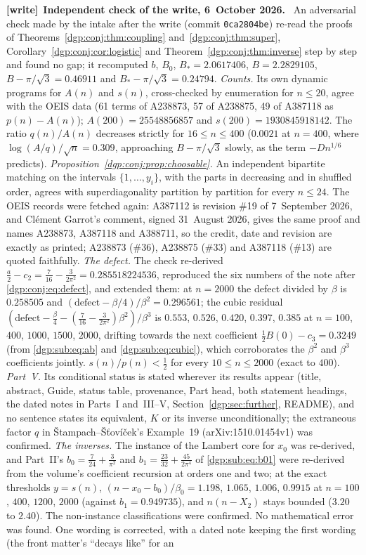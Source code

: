 \documentclass[11pt,letterpaper]{article}
\numberwithin{equation}{section}
\theoremstyle{remark}\newtheorem{remark}[theorem]{Remark}
\newcommand{\file}[1]{\nolinkurl{#1}}
\newenvironment{writenote}[1][]{\par\smallskip\begingroup\small
 \noindent\textbf{[write]}\if\relax\detokenize{#1}\relax\else~\textbf{#1.}\fi\ }%
 {\par\endgroup\smallskip}
\begin{document}
\begin{writenote}[Independent check of the write, 6~October 2026]
An adversarial check made by the intake after the write (commit \file{0ca2804be}) re-read the proofs of Theorems~\ref{dgp:conj:thm:coupling} and~\ref{dgp:conj:thm:super}, Corollary~\ref{dgp:conj:cor:logistic} and Theorem~\ref{dgp:conj:thm:inverse} step by step and found no gap; it recomputed $b$, $B_0$, $B_*=2.0617406$, $B=2.2829105$, $B-\pi/\sqrt3=0.46911$ and $B_*-\pi/\sqrt3=0.24794$. \emph{Counts.} Its own dynamic programs for $A(n)$ and $s(n)$, cross-checked by enumeration for $n\le20$, agree with the OEIS data (61 terms of A238873, 57 of A238875, 49 of A387118 as $p(n)-A(n)$); $A(200)=25548856857$ and $s(200)=1930845918142$. The ratio $q(n)/A(n)$ decreases strictly for $16\le n\le400$ ($0.0021$ at $n=400$, where $\log(A/q)/\sqrt n=0.309$, approaching $B-\pi/\sqrt3$ slowly, as the term $-Dn^{1/6}$ predicts). \emph{Proposition~\ref{dgp:conj:prop:choosable}.} An independent bipartite matching on the intervals $\{1,\dots,y_i\}$, with the parts in decreasing and in shuffled order, agrees with superdiagonality partition by partition for every $n\le24$. The OEIS records were fetched again: A387112 is revision \#19 of 7~September 2026, and Clément Garrot's comment, signed 31~August 2026, gives the same proof and names A238873, A387118 and A388711, so the credit, date and revision are exactly as printed; A238873 (\#36), A238875 (\#33) and A387118 (\#13) are quoted faithfully. \emph{The defect.} The check re-derived $\frac a2-c_2=\frac7{16}-\frac3{2\pi^2}=0.285518224536$, reproduced the six numbers of the note after \eqref{dgp:conj:eq:defect}, and extended them: at $n=2000$ the defect divided by $\beta$ is $0.258505$ and $(\text{defect}-\beta/4)/\beta^2=0.296561$; the cubic residual $(\text{defect}-\frac\beta4-(\frac7{16}-\frac3{2\pi^2})\beta^2)/\beta^3$ is $0.553$, $0.526$, $0.420$, $0.397$, $0.385$ at $n=100$, $400$, $1000$, $1500$, $2000$, drifting towards the next coefficient $\frac12B(0)-c_3=0.3249$ (from \eqref{dgp:sub:eq:ab} and \eqref{dgp:sub:eq:cubic}), which corroborates the $\beta^2$ and $\beta^3$ coefficients jointly. $s(n)/p(n)<\frac12$ for every $10\le n\le2000$ (exact to $400$). \emph{Part~V.} Its conditional status is stated wherever its results appear (title, abstract, Guide, status table, provenance, Part head, both statement headings, the dated notes in Parts~I and~III--V, Section~\ref{dgp:sec:further}, README), and no sentence states its equivalent, $K$ or its inverse unconditionally; the extraneous factor $q$ in Štampach--Šťovíček's Example~19 (arXiv:1510.01454v1) was confirmed. \emph{The inverses.} The instance of the Lambert core for $x_0$ was re-derived, and Part~II's $b_0=\frac7{24}+\frac3{\pi^2}$ and $b_1=\frac{23}{32}+\frac{45}{2\pi^4}$ of \eqref{dgp:sub:eq:b01} were re-derived from the volume's coefficient recursion at orders one and two; at the exact thresholds $y=s(n)$, $(n-x_0-b_0)/\beta_0=1.198$, $1.065$, $1.006$, $0.9915$ at $n=100$, $400$, $1200$, $2000$ (against $b_1=0.949735$), and $n(n-X_2)$ stays bounded ($3.20$ to $2.40$). The non-instance classifications were confirmed. No mathematical error was found. One wording is corrected, with a dated note keeping the first wording (the front matter's ``decays like'' for an 
\end{writenote}
\end{document}
